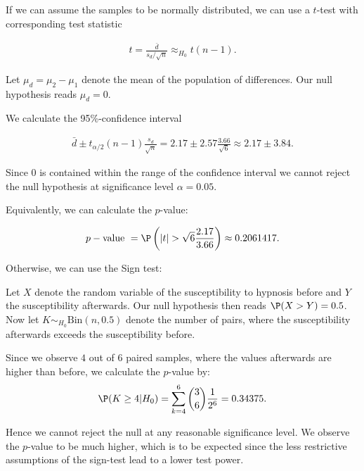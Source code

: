 \begin{solution}

If we can assume the samples to be normally distributed, we can use a $t$-test
with corresponding test statistic

\begin{align*}
    t = \frac{\bar{d}}{s_d/\sqrt{n}} \approx_{H_0} t(n - 1).
\end{align*}

Let $\mu_d = \mu_2 - \mu_1$ denote the mean of the population of differences.
Our null hypothesis reads $\mu_d = 0$.

We calculate the 95\%-confidence interval

\begin{align*}
    \bar{d} \pm t_{\alpha/2}(n-1) \frac{s_d}{\sqrt{n}}
    = 2.17 \pm 2.57 \frac{3.66}{\sqrt{6}}
    \approx 2.17 \pm 3.84.
\end{align*}

Since $0$ is contained within the range of the confidence interval we cannot
reject the null hypothesis at significance level $\alpha = 0.05$.

Equivalently, we can calculate the $p$-value:

\begin{align*}
    p-\text{value } = \P\left(|t| > \sqrt{6}\frac{2.17}{3.66}\right) \approx 0.2061417.
\end{align*}

Otherwise, we can use the Sign test:

Let $X$ denote the random variable of the susceptibility to hypnosis before
and $Y$ the susceptibility afterwards. Our null hypothesis then reads $\P(X > Y) = 0.5$.
Now let $K \sim_{H_0} \text{Bin}(n,0.5)$ denote the number of pairs, where the susceptibility
afterwards exceeds the susceptibility before.

Since we observe $4$ out of $6$ paired samples, where the values afterwards
are higher than before, we calculate the $p$-value by:
\begin{align*}
    \P(K \geq 4 | H_0) = \sum_{k=4}^6 \binom{3}{6}\frac{1}{2^6} = 0.34375.
\end{align*}

Hence we cannot reject the null at any reasonable significance level.
We observe the $p$-value to be much higher, which is to be expected since
the less restrictive assumptions of the sign-test lead to a lower test power.
\end{solution}

